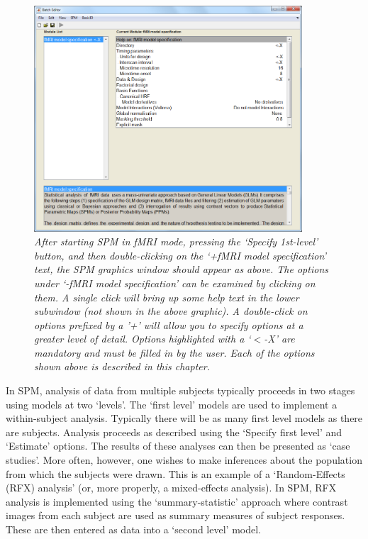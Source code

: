 \begin{figure}
\begin{center}
\includegraphics[width=100mm]{fmri_spec/fmri_model}
\end{center}
\caption{\em After starting SPM in fMRI mode, pressing the `Specify 1st-level' button, and then double-clicking on the `+fMRI model specification' text, the SPM graphics window should appear as above. The options under `-fMRI model specification' can be examined by clicking on them. A single click will bring up some help text in the lower subwindow (not shown in the above graphic). A double-click on options prefixed by a '+' will allow you to specify options at a greater level of detail. Options highlighted with a `$<$-X' are mandatory and must be filled in by the user. Each of the options shown above is described in this chapter. \label{spec}}
\end{figure}

In SPM, analysis of data from multiple subjects typically proceeds in two stages using models at two `levels'. The `first level' models are used to implement a within-subject analysis. Typically there will be as many first level models as there are subjects. Analysis proceeds as described using the `Specify first level' and `Estimate' options. The results of these analyses can then be presented as `case studies'. More often, however, one wishes to make inferences about the population from which the subjects were drawn. This is an example of a `Random-Effects (RFX) analysis' (or, more properly, a mixed-effects analysis). In SPM, RFX analysis is implemented using the `summary-statistic' approach where contrast images from each subject are used as summary measures of subject responses. These are then entered as data into a `second level' model. 

